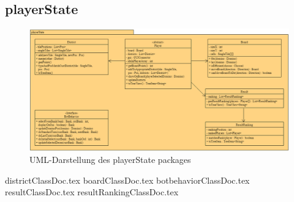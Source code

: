 \subsection{playerState}
\label{ss:playerState}

\begin{figure}
	\centering
	\includegraphics[width=\linewidth]{pics/playerStatePackage}
	\caption{UML-Darstellung des playerState packages}
	\label{fig:playerStatePackage}
\end{figure}

{districtClassDoc.tex}
{boardClassDoc.tex}
{botbehaviorClassDoc.tex}
{resultClassDoc.tex}
{resultRankingClassDoc.tex}
